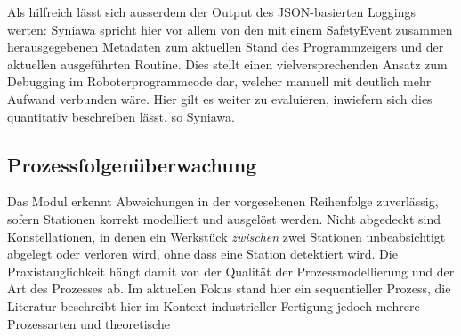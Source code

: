 Als hilfreich lässt sich ausserdem der Output des JSON-basierten Loggings
werten: Syniawa spricht hier vor allem von den mit einem SafetyEvent zusammen
herausgegebenen Metadaten zum aktuellen Stand des Programmzeigers und
der aktuellen
ausgeführten Routine. Dies stellt einen vielversprechenden Ansatz zum Debugging
im Roboterprogrammcode dar, welcher manuell mit deutlich mehr Aufwand verbunden
wäre. Hier gilt es weiter zu evaluieren, inwiefern sich dies quantitativ
beschreiben lässt, so Syniawa.

\subsection{Prozessfolgenüberwachung}

Das Modul erkennt Abweichungen in der vorgesehenen Reihenfolge zuverlässig,
sofern Stationen korrekt modelliert und ausgelöst werden. Nicht abgedeckt sind
Konstellationen, in denen ein Werkstück \emph{zwischen} zwei Stationen
unbeabsichtigt abgelegt oder verloren wird, ohne dass eine Station detektiert
wird. Die Praxistauglichkeit hängt damit von der Qualität der
Prozessmodellierung und der Art des Prozesses ab. Im aktuellen Fokus stand hier
ein sequentieller Prozess, die Literatur beschreibt hier im Kontext
industrieller Fertigung jedoch mehrere Prozessarten und theoretische
